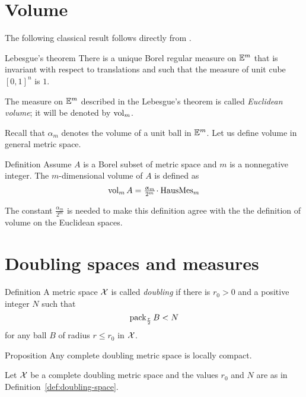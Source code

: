 \section{Volume}

The following classical result follows directly from \cite[2.7.7]{federer}.

\begin{thm}{Lebesgue's theorem}\label{thm:lebesgue}
There is a unique Borel regular  measure on $\mathbb{E}^m$
that is invariant with respect to translations
and such that the measure of unit cube $[0,1]^n$ is $1$.
\end{thm}

The measure on $\mathbb{E}^m$ described in the Lebesgue's theorem is called \emph{Euclidean volume};
it will be denoted by $\mathop{\rm vol}\nolimits_m$.

Recall that $\alpha_m$ denotes the volume of a unit ball in $\mathbb{E}^m$.
Let us define volume in general metric space.


\begin{thm}{Definition}\label{def:vol}
Assume $A$ is a Borel subset of metric space and $m$ is a nonnegative integer.
The $m$-dimensional volume of $A$ is defined as 
\[\vol_mA=\tfrac{\alpha_m}{2^m}\cdot\HausMes_m\]
\end{thm}

The constant $\tfrac{\alpha_m}{2^m}$ is needed to make this definition  agree with the 
the definition of volume on the Euclidean spaces.





\section{Doubling spaces and measures}\label{sec:doubling-spaces}

\begin{thm}{Definition}\label{def:doubling-space}
A metric space $\mathcal{X}$ is called 
\emph{doubling} 
if there is $r_0>0$ 
and a positive integer $N$ 
such that 
$$\mathop{\rm pack}\nolimits_{\frac r2} B<N$$
for any ball $B$ of radius $r\le r_0$ in $\mathcal{X}$.
\end{thm}

\begin{thm}{Proposition}\label{prop:2ble=>loc.compact}
Any complete doubling metric space is locally compact.
\end{thm}

 Let $\mathcal{X}$ be a complete doubling metric space 
and the values $r_0$ and $N$ are as in  Definition~\ref{def:doubling-space}.

